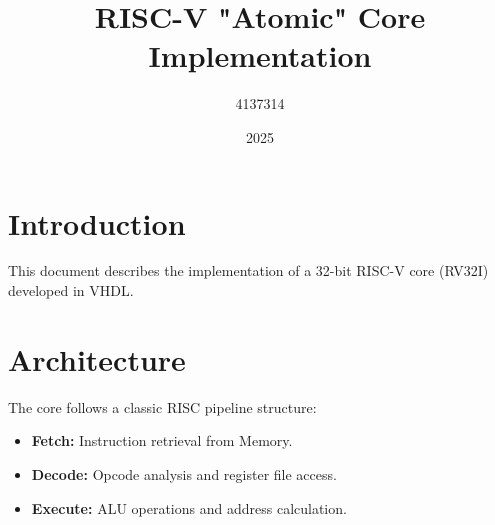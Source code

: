 \documentclass{article}
\title{RISC-V "Atomic" Core Implementation}
\author{4137314}
\date{2025}
\begin{document}
\maketitle

\section{Introduction}
This document describes the implementation of a 32-bit RISC-V core (RV32I) developed in VHDL.

\section{Architecture}
The core follows a classic RISC pipeline structure:
\begin{itemize}
    \item \textbf{Fetch:} Instruction retrieval from Memory.
    \item \textbf{Decode:} Opcode analysis and register file access.
    \item \textbf{Execute:} ALU operations and address calculation.
\end{itemize}
\end{document}
